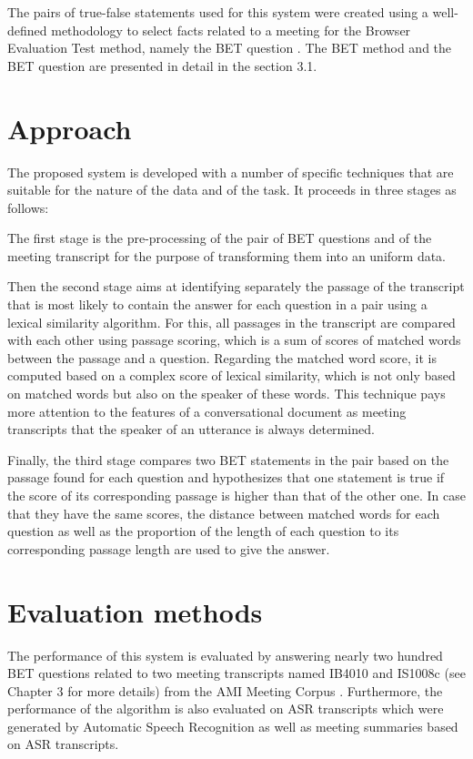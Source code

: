 The pairs of true-false statements used for this system were created using a well-defined methodology to select facts related to a meeting for the Browser Evaluation Test method, namely the BET question \cite{BET}. The BET method and the BET question are presented in detail  in the section 3.1.







\section{Approach  }
The proposed system is developed with a number of specific techniques that are suitable for the nature of the data and of the task. It proceeds in three stages as follows: 

The first stage is the pre-processing of the pair of BET questions and of the meeting transcript for the purpose of transforming them into an uniform data.

Then the second stage aims at identifying separately the passage of the transcript that is most likely to contain the answer for each question in a pair using a lexical similarity algorithm. For this, all passages in the transcript are compared with each other using passage scoring, which is a sum of scores of matched words between the passage and a question. Regarding the matched word score, it is computed based on a complex score of lexical similarity, which is not only based on matched words but also on the speaker of these words. This technique pays more attention to the features of a conversational document as meeting transcripts that the speaker of an utterance is always determined. 
 
Finally, the third stage compares two BET statements in the pair based on the passage found for each question and hypothesizes that one statement is true if the score of its corresponding passage is higher than that of the other one. In case that they have the same scores, the distance between matched words for each question as well as the proportion of the length of each question to its corresponding passage length are used to give the answer. 


\section{Evaluation methods}
The performance of this system is evaluated by answering nearly two hundred BET questions related to two meeting transcripts named IB4010 and IS1008c (see Chapter 3 for more details) from the AMI Meeting Corpus \cite{AMI_corpus}. Furthermore, the performance of the algorithm is also evaluated on ASR transcripts which were generated by Automatic Speech Recognition \cite{ASR_transcrips} as well as meeting summaries based on ASR transcripts.
 
